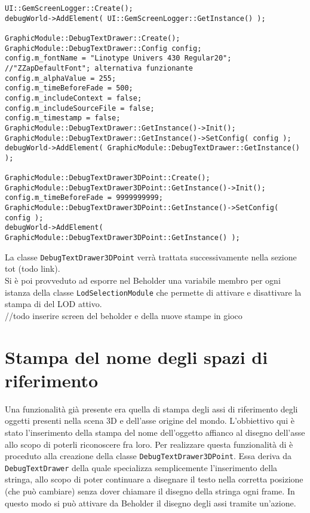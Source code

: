 \begin{lstlisting}[style=maurizio-code]
UI::GemScreenLogger::Create();
debugWorld->AddElement( UI::GemScreenLogger::GetInstance() );

GraphicModule::DebugTextDrawer::Create();
GraphicModule::DebugTextDrawer::Config config;
config.m_fontName = "Linotype Univers 430 Regular20"; //"ZZapDefaultFont"; alternativa funzionante
config.m_alphaValue = 255;
config.m_timeBeforeFade = 500;
config.m_includeContext = false;
config.m_includeSourceFile = false;
config.m_timestamp = false;
GraphicModule::DebugTextDrawer::GetInstance()->Init();
GraphicModule::DebugTextDrawer::GetInstance()->SetConfig( config );
debugWorld->AddElement( GraphicModule::DebugTextDrawer::GetInstance() );

GraphicModule::DebugTextDrawer3DPoint::Create();
GraphicModule::DebugTextDrawer3DPoint::GetInstance()->Init();
config.m_timeBeforeFade = 9999999999;
GraphicModule::DebugTextDrawer3DPoint::GetInstance()->SetConfig( config );
debugWorld->AddElement( GraphicModule::DebugTextDrawer3DPoint::GetInstance() );
\end{lstlisting}

La classe \texttt{DebugTextDrawer3DPoint} verrà trattata successivamente nella sezione tot (todo link).\\

Si è poi provveduto ad esporre nel Beholder una variabile membro per ogni istanza della classe \texttt{LodSelectionModule} che permette di attivare e disattivare la stampa di del LOD attivo.\\

//todo inserire screen del beholder e della nuove stampe in gioco

\section{Stampa del nome degli spazi di riferimento}

Una funzionalità già presente era quella di stampa degli assi di riferimento degli oggetti presenti nella scena 3D e dell'asse origine del mondo. L'obbiettivo qui è stato l'inserimento della stampa del nome dell'oggetto affianco al disegno dell'asse allo scopo di poterli riconoscere fra loro. Per realizzare questa funzionalità di è proceduto alla creazione della classe \texttt{DebugTextDrawer3DPoint}. Essa deriva da \texttt{DebugTextDrawer} della quale specializza semplicemente l'inserimento della stringa, allo scopo di poter continuare a disegnare il testo nella corretta posizione (che può cambiare) senza dover chiamare il disegno della stringa ogni frame. In questo modo si può attivare da Beholder il disegno degli assi tramite un'azione.\\

